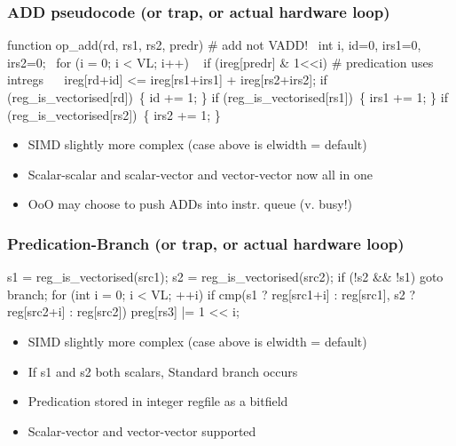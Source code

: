 \documentclass[slidestop]{beamer}
\begin{document}
\begin{frame}[fragile]
\frametitle{ADD pseudocode (or trap, or actual hardware loop)}

\begin{semiverbatim}
function op_add(rd, rs1, rs2, predr) # add not VADD!
  int i, id=0, irs1=0, irs2=0;
  for (i = 0; i < VL; i++)
    if (ireg[predr] & 1<<i) # predication uses intregs
       ireg[rd+id] <= ireg[rs1+irs1] + ireg[rs2+irs2];
    if (reg_is_vectorised[rd]) \{ id += 1; \}
    if (reg_is_vectorised[rs1]) \{ irs1 += 1; \}
    if (reg_is_vectorised[rs2]) \{ irs2 += 1; \}
\end{semiverbatim}

  \begin{itemize}
   \item SIMD slightly more complex (case above is elwidth = default)
   \item Scalar-scalar and scalar-vector and vector-vector now all in one
   \item OoO may choose to push ADDs into instr. queue (v. busy!)
  \end{itemize}
\end{frame}



\begin{frame}[fragile]
\frametitle{Predication-Branch (or trap, or actual hardware loop)}

\begin{semiverbatim}
s1 = reg_is_vectorised(src1);
s2 = reg_is_vectorised(src2);
if (!s2 && !s1) goto branch;
for (int i = 0; i < VL; ++i)
   if cmp(s1 ? reg[src1+i] : reg[src1],
          s2 ? reg[src2+i] : reg[src2])
      preg[rs3] |= 1 << i;
\end{semiverbatim}

  \begin{itemize}
   \item SIMD slightly more complex (case above is elwidth = default)  
   \item If s1 and s2 both scalars, Standard branch occurs
   \item Predication stored in integer regfile as a bitfield
   \item Scalar-vector and vector-vector supported
  \end{itemize}
\end{frame}
\end{document}
